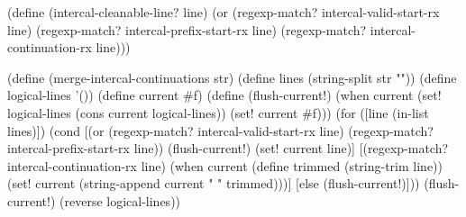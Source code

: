 \begin{CodeBlock}
(define (intercal-cleanable-line? line)
  (or (regexp-match? intercal-valid-start-rx line)
      (regexp-match? intercal-prefix-start-rx line)
      (regexp-match? intercal-continuation-rx line)))

(define (merge-intercal-continuations str)
  (define lines (string-split str "\n"))
  (define logical-lines '())
  (define current #f)
  (define (flush-current!)
    (when current
      (set! logical-lines (cons current logical-lines))
      (set! current #f)))
  (for ([line (in-list lines)])
    (cond
      [(or (regexp-match? intercal-valid-start-rx line)
           (regexp-match? intercal-prefix-start-rx line))
       (flush-current!)
       (set! current line)]
      [(regexp-match? intercal-continuation-rx line)
       (when current
         (define trimmed (string-trim line))
         (set! current (string-append current " " trimmed)))]
      [else
       (flush-current!)]))
  (flush-current!)
  (reverse logical-lines))
\end{CodeBlock}
